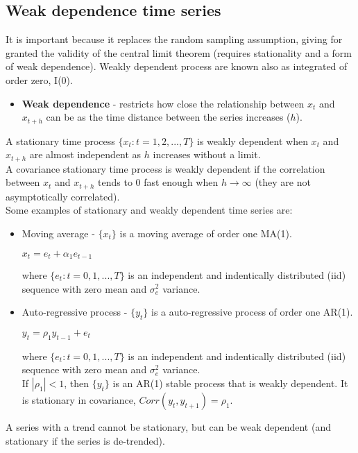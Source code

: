 \documentclass[10pt, a4paper, landscape]{extarticle}
\begin{document}
\begin{multicols}{3}
	\subsection*{Weak dependence time series}
		It is important because it replaces the random sampling assumption, giving for granted the validity of the central limit theorem (requires stationality and a form of weak dependence). Weakly dependent process are known also as integrated of order zero, I(0).
		\begin{itemize}[leftmargin=*]
			\item \textbf{Weak dependence} - restricts how close the relationship between $x_t$ and $x_{t+h}$ can be as the time distance between the series increases ($h$).
		\end{itemize}
		A stationary time process $\lbrace x_t: t = 1, 2, ..., T \rbrace$ is weakly dependent when $x_t$ and $x_{t+h}$ are almost independent as $h$ increases without a limit.
		\\ A covariance stationary time process is weakly dependent if the correlation between $x_t$ and $x_{t+h}$ tends to $0$ fast enough when $h \rightarrow \infty$ (they are not asymptotically correlated).
		\\ Some examples of stationary and weakly dependent time series are:
		\begin{itemize}[leftmargin=*]
			\item Moving average - $\lbrace x_t \rbrace$ is a moving average of order one MA(1).
			\begin{center}
				$x_t = e_t + \alpha_1 e_{t-1}$
			\end{center}
			where $\lbrace e_t: t = 0, 1, ..., T \rbrace$ is an independent and indentically distributed (iid) sequence with zero mean and $\sigma^2_e$ variance. 
			\item Auto-regressive process - $\lbrace y_t \rbrace$ is a auto-regressive process of order one AR(1).
			\begin{center}
				$y_t = \rho_1 y_{t-1} + e_t$
			\end{center}
			where $\lbrace e_t: t = 0, 1, ..., T \rbrace$ is an independent and indentically distributed (iid) sequence with zero mean and $\sigma^2_e$ variance.		
		\\ If $|\rho_1|<1$, then $\lbrace y_t \rbrace$ is an AR(1) stable process that is weakly dependent. It is stationary in covariance, $Corr(y_t, y_{t+1}) = \rho_1$.
		\end{itemize}
	A series with a trend cannot be stationary, but can be weak dependent (and stationary if the series is de-trended).
	

\end{multicols}
\end{document}
